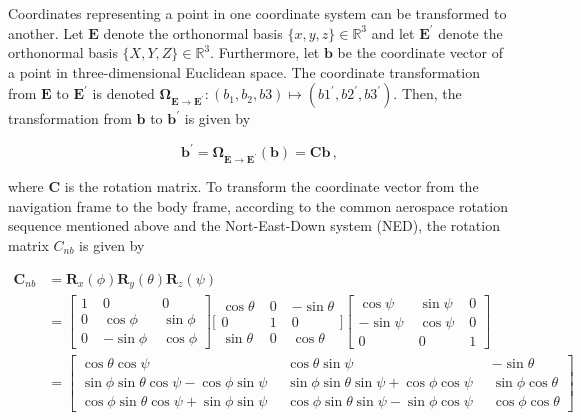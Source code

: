 Coordinates representing a point in one coordinate system can be transformed to another. Let $\mathbf{E}$ denote the orthonormal basis $\{x, y, z\} \in \mathbb{R}^3$ and let $\mathbf{E}^{'}$ denote the orthonormal basis $\{X, Y, Z\} \in \mathbb{R}^3$. Furthermore, let $\mathbf{b}$ be the coordinate vector of a point in three-dimensional Euclidean space. The coordinate transformation from $\mathbf{E}$ to $\mathbf{E}^{'}$ is denoted $\mathbf{\Omega}_{\mathbf{E} \rightarrow \mathbf{E}^{'}}: (b_1, b_2, b3) \mapsto (b1^{'}, b2^{'}, b3^{'})$. Then, the transformation from $\mathbf{b}$ to $\mathbf{b}^{'}$ is given by

\begin{equation}
  \mathbf{b^{'}} = \mathbf{\Omega}_{\mathbf{E} \rightarrow \mathbf{E}^{'}}(\mathbf{b}) = \mathbf{C} \mathbf{b}\,,
\end{equation}

\noindent
where $\mathbf{C}$ is the rotation matrix. To transform the coordinate vector from the navigation frame to the body frame, according to the common aerospace rotation sequence mentioned above and the Nort-East-Down system (NED), the rotation matrix $C_{nb}$ is given by

\begin{equation}
\begin{split}
\mathbf{C}_{nb} & = \mathbf{R}_x(\phi) \mathbf{R}_y(\theta) \mathbf{R}_z(\psi) \\
 & = {\left[ \begin{smallmatrix}
    1 \; & 0 \; & 0 \\
    0 \; & \cos \phi \; & \sin \phi \\
    0 \; & -\sin \phi \; & \cos \phi
    \end{smallmatrix}\right]}
    {\bigg[ \begin{smallmatrix}
    \cos \theta \; & 0 \; & -\sin \theta \\
    0 \; & 1 \; & 0 \\
    \sin \theta \; & 0 \; & \cos \theta
    \end{smallmatrix} \bigg]}
    {\left[\begin{smallmatrix}
    \cos \psi \; & \sin \psi \; & 0 \\
    -\sin \psi \; & \cos \psi \; & 0 \\
    0 \; & 0 \; & 1
    \end{smallmatrix}\right]}\\
 & = {\left[\begin{smallmatrix}
   \cos \theta \cos \psi \; &
    \cos \theta \sin \psi \; &
   -\sin \theta \\
    \sin \phi \sin \theta \cos \psi - \cos \phi \sin \psi \;\; &
    \sin \phi \sin \theta \sin \psi + \cos \phi \cos \psi \;\; &
    \sin \phi \cos \theta \\
    \cos \phi \sin \theta \cos \psi + \sin \phi \sin \psi \;\; &
    \cos \phi \sin \theta \sin \psi - \sin \phi \cos \psi \;\; &
    \cos \phi \cos \theta
  \end{smallmatrix}\right]}
\end{split}
\end{equation}

